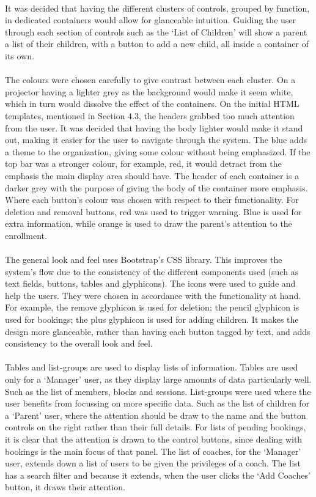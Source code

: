 \documentclass{l3proj}
\begin{document}
\\ It was decided that having the different clusters of controls, grouped by function, in dedicated containers would allow for glanceable intuition. Guiding the user through each section of controls such as the `List of Children' will show a parent a list of their children, with a button to add a new child, all inside a container of its own.\\
\\The colours were chosen carefully to give contrast between each cluster. On a projector having a lighter grey as the background would make it seem white, which in turn would dissolve the effect of the containers. On the initial HTML templates, mentioned in Section 4.3, the headers grabbed too much attention from the user. It was decided that having the body lighter would make it stand out, making it easier for the user to navigate through the system. The blue adds a theme to the organization, giving some colour without being emphasized. If the top bar was a stronger colour,  for example, red, it would detract from the emphasis the main display area should have. The header of each container is a darker grey with the purpose of giving the body of the container more emphasis. Where each button's colour was chosen with respect to their functionality. For deletion and removal buttons, red was used to trigger warning. Blue is used for extra information, while orange is used to draw the parent's attention to the enrollment. \\
\\The general look and feel uses Bootstrap's CSS library. This improves the system's flow due to the consistency of the different components used (such as text fields, buttons, tables and glyphicons). The icons were used to guide and help the users. They were chosen in accordance with the functionality at hand. For example, the remove glyphicon is used for deletion; the pencil glyphicon is used for bookings; the plus glyphicon is used for adding children. It makes the design more glanceable, rather than having each button tagged by text, and adds consistency to the overall look and feel.\\
\\Tables and list-groups are used to display lists of information. Tables are used only for a `Manager' user, as they display large amounts of data particularly well. Such as the list of members, blocks and sessions. List-groups were used where the user benefits from focussing on more specific data. Such as the list of children for a `Parent' user, where the attention should be draw to the name and the button controls on the right rather than their full details. For lists of pending bookings, it is clear that the attention is drawn to the control buttons, since dealing with bookings is the main focus of that panel. The list of coaches, for the `Manager' user, extends down a list of users to be given the privileges of a coach. The list has a search filter and because it extends, when the user clicks the `Add Coaches' button, it draws their attention.
\end{document}
